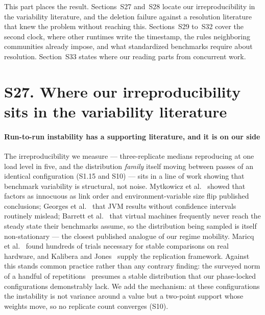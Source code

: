 \documentclass[10pt,journal,onecolumn]{IEEEtran}
\begin{document}
This part places the result. Sections~S27 and~S28 locate our irreproducibility in the variability literature, and the deletion failure against a resolution literature that knew the problem without reaching this. Sections~S29 to~S32 cover the second clock, where other runtimes write the timestamp, the rules neighboring communities already impose, and what standardized benchmarks require about resolution. Section~S33 states where our reading parts from concurrent work.

\section{S27. Where our irreproducibility sits in the variability literature}

\paragraph{Run-to-run instability has a supporting literature, and it is on our side}
The irreproducibility we measure --- three-replicate medians reproducing at one load level in
five, and the distribution \emph{family} itself moving between passes of an identical configuration (S1.15 and S10) --- sits in a line of work showing that benchmark
variability is structural, not noise. Mytkowicz et al.~\cite{mytkowicz2009wrong} showed that
factors as innocuous as link order and environment-variable size flip published conclusions;
Georges et al.~\cite{georges2007rigorous} that JVM results without confidence intervals routinely
mislead; Barrett et al.~\cite{barrett2017warmup} that virtual machines frequently never reach the
steady state their benchmarks assume, so the distribution being sampled is itself non-stationary
--- the closest published analogue of our regime mobility. Maricq et
al.~\cite{maricq2018taming} found hundreds of trials necessary for stable comparisons on real
hardware, and Kalibera and Jones~\cite{kalibera2013rigorous} supply the replication framework.
Against this stands common practice rather than any contrary finding: the surveyed norm of a
handful of repetitions~\cite{vanderkouwe2019sok,hoefler2015benchmarking} presumes a stable
distribution that our phase-locked configurations demonstrably lack. We add the mechanism: at
these configurations the instability is not variance around a value but a two-point support
whose weights move, so no replicate count converges (S10).
\end{document}
